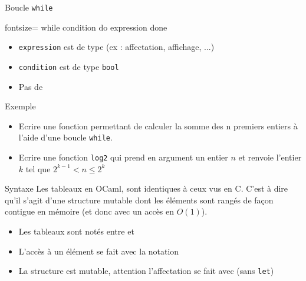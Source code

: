 \documentclass[10pt]{beamer}
\begin{document}
\begin{frame}[fragile]{\Ctitle}{\stitle}
	\begin{block}{Boucle  {\tt while}}
    \begin{OCaml*}{fontsize=\small}
while condition do
    expression
done
    \end{OCaml*}
    \begin{itemize}
        \item<4-> {\tt expression} est de type  (ex : affectation, affichage, ...)
        \item<5-> {\tt condition} est de type {\tt bool}
        \item<6-> Pas de 
    \end{itemize} 
    \end{block}
\end{frame}

\begin{frame}{\Ctitle}{\stitle}
    \begin{exampleblock}{Exemple}
        \begin{itemize}
            \item<1-> Ecrire une fonction permettant de calculer la somme des n premiers entiers à l'aide d'une boucle {\tt while}. 
            \item<2-> Ecrire une fonction {\tt log2} qui prend en argument un entier $n$ et renvoie l'entier $k$ tel que $2^{k-1}< n \leq 2^k$
        \end{itemize}
    \end{exampleblock}
\end{frame}


\begin{frame}[fragile]{\Ctitle}{\stitle}
    \begin{block}{Syntaxe}
    Les tableaux en OCaml, sont identiques à ceux vus en C. C'est à dire qu'il s'agit d'une structure mutable dont les éléments sont rangés de façon contigue en mémoire (et donc avec un accès en $O(1)$).
    \begin{itemize}
        \item<1-> Les tableaux sont notés entre \kw{[|} et \kw{|]}\\
        \item<3-> L'accès à un élément se fait avec la notation \\
        \item<5-> La structure est mutable, attention l'affectation se fait avec \kw{<-} (sans {\tt let})\\
    \end{itemize}
\end{block}
\end{frame}
\end{document}
